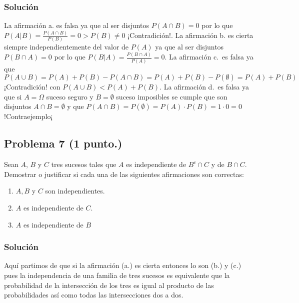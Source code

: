 \documentclass[
]{article}
\providecommand{\tightlist}{%
  \setlength{\itemsep}{0pt}\setlength{\parskip}{0pt}}
\begin{document}
\hypertarget{soluciuxf3n-4}{%
\subsubsection{Solución}\label{soluciuxf3n-4}}

La afirmación a. es falsa ya que al ser disjuntos \(P(A\cap B)=0\) por
lo que \(P(A|B)=\frac{P(A\cap B)}{P(B)}=0>P(B)\neq 0\) ¡Contradición!.
La afirmación b. es cierta siempre independientemente del valor de
\(P(A)\) ya que al ser disjuntos \(P(B\cap A)=0\) por lo que
\(P(B|A)=\frac{P(B\cap A)}{P(A)}=0\). La afirmación c.~es falsa ya que
\(P(A\cup B)=P(A)+P(B)-P(A\cap B)=P(A)+P(B)-P(\emptyset)=P(A)+P(B)\)
¡Contradición! con \(P(A\cup B)< P(A)+P(B)\). La afirmación d.~es falsa
ya que si \(A=\Omega\) suceso seguro y \(B=\emptyset\) suceso imposibles
se cumple que son disjuntos \(A\cap B=\emptyset\) y que
\(P(A\cap B)=P(\emptyset)=P(A)\cdot P(B)=1\cdot 0=0\) !Contraejemplo¡

\hypertarget{problema-7}{%
\subsection{\texorpdfstring{Problema 7
(\textbf{1 punto.})}{Problema 7 ()}}\label{problema-7}}

Sean \(A\), \(B\) y \(C\) tres sucesos tales que \(A\) es independiente
de \(B^c\cap C\) y de \(B\cap C\). Demostrar o justificar si cada una de
las siguientes afirmaciones son correctas:

\begin{enumerate}
\def\labelenumi{\alph{enumi}.}
\tightlist
\item
  \(A,B\) y \(C\) son independientes.
\item
  \(A\) es independiente de \(C\).
\item
  \(A\) es independiente de \(B\)
\end{enumerate}

\hypertarget{soluciuxf3n-5}{%
\subsubsection{Solución}\label{soluciuxf3n-5}}

Aquí partimos de que si la afirmación (a.) es cierta entonces lo son
(b.) y (c.) pues la independencia de una familia de tres sucesos es
equivalente que la probabilidad de la intersección de los tres es igual
al producto de las probabilidades así como todas las intersecciones dos
a dos.
\end{document}
